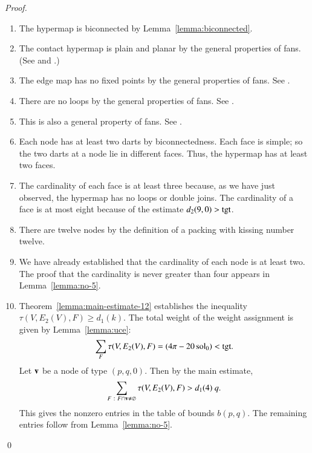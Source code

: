 \documentclass{llncs}
\def\op#1{{\hbox{#1}}}
\begin{document}
\begin{proof}
\begin{enumerate}
\item {} The hypermap is biconnected by
  Lemma~\ref{lemma:biconnected}.
\item {} The contact hypermap is plain and planar by the
  general properties of fans.  (See \cite[Lemma~5.8]{DSP} and \cite[5.3]{DSP}.)
\item {} The
  edge map has no fixed points by the general properties of fans.
See \cite[Lemma~5.8]{DSP}.
\item {} 
  There are no loops by the general properties of
  fans. See \cite[Lemma~5.8]{DSP}.
\item {} This is also a general property of fans. See \cite[Lemma~5.8]{DSP}.
\item {} Each node has at least two darts by
  biconnectedness. Each face is simple; so the two darts at a node lie
  in different faces.  Thus, the hypermap has at least two faces.
\item {} The cardinality of each face is at least three
  because, as we have just observed, the hypermap has no loops or double joins.
  The cardinality of a face is at most eight because of the estimate
  $d_2(9,0)>\op{tgt}$.
\item {} There are twelve nodes by the definition of a
  packing with kissing number twelve.
\item {} We have already established that the cardinality
  of each node is at least two.  The proof that the cardinality is
  never  greater than four appears in Lemma~\ref{lemma:no-5}.
\item {} Theorem~\ref{lemma:main-estimate-12} establishes 
 the inequality $\tau(V,E_2(V),F)\ge d_1(k)$.
  The total weight of the weight assignment is given by
  Lemma~\ref{lemma:uce}:
\[
  \sum_F \tau(V,E_2(V),F) = (4\pi - 20\sol_0) < \op{tgt}.
\]
%
Let ${\mathbf v}$ be a node of type $(p,q,0)$.  
Then by the main estimate,
\[
\sum_{F\ :\  F\cap {\mathbf v}\ne\varnothing}\tau(V,E_2(V),F) > d_1(4)~q.
\]
This gives the nonzero entries in the table of bounds $b(p,q)$.  The
remaining entries follow from Lemma~\ref{lemma:no-5}.
\end{enumerate}
\qed\end{proof}
\end{document}
